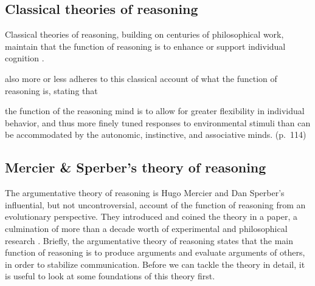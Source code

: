 \subsection{Classical theories of reasoning}

Classical theories of reasoning, building on centuries of philosophical work, maintain that the function of reasoning is to enhance or support individual cognition \citep{MS11}.



\citet{Goel22} also more or less adheres to this classical account of what the function of reasoning is, stating that
\begin{quoting}
    the function of the reasoning mind is to allow for greater flexibility in individual behavior, and thus more finely tuned responses to environmental stimuli than can be accommodated by the autonomic, instinctive, and associative minds.
    \hfill (p.~114)
\end{quoting}

\subsection{Mercier \& Sperber's theory of reasoning}


The argumentative theory of reasoning is Hugo Mercier and Dan Sperber's influential, but not uncontroversial, account of the function of reasoning from an evolutionary perspective. They introduced and coined the theory in a \citeyear{MS11} paper, a culmination of more than a decade worth of experimental and philosophical research \citep{Sperber01, Sperber10, Mercier09, Sperber00}.
Briefly, the argumentative theory of reasoning states that the main function of reasoning is to produce arguments and evaluate arguments of others, in order to stabilize communication.
Before we can tackle the theory in detail, it is useful to look at some foundations of this theory first.

